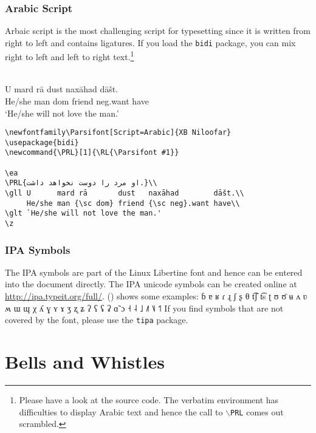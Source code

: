 \subsubsection{Arabic Script}

Arbaic script is the most challenging script for typesetting since it is written from right to left
and contains ligatures. If you load the \texttt{bidi} package, you can mix right to left and left to
right text.\footnote{
  Please have a look at the source code. The verbatim environment has difficulties to display Arabic
  text and hence the call to \texttt{$\backslash$PRL} comes out scrambled.
}

\ea
{}\\
 \gll   U mard rā dust naxāhad dāšt.\\
   He/she man {\sc dom} friend {\sc neg}.want have\\
\glt `He/she will not love the man.'
\z

\begin{verbatim}
\newfontfamily\Parsifont[Script=Arabic]{XB Niloofar}
\usepackage{bidi}
\newcommand{\PRL}[1]{\RL{\Parsifont #1}}

\ea
\PRL{او مرد را دوست نخواهد داشت.}\\
\gll U      mard rā       dust   naxāhad        dāšt.\\
     He/she man {\sc dom} friend {\sc neg}.want have\\
\glt `He/she will not love the man.'
\z
\end{verbatim}

\subsubsection{IPA Symbols}

The IPA symbols are part of the Linux Libertine font and hence can be entered into the document
directly. The IPA unicode symbols can be created online at
\url{http://ipa.typeit.org/full/}. () shows some examples:
\ea
ɓ ɐ ʁ ɾ ɻ ʃ ʂ θ t͡ʃ  t͡s  ʈ ʊ ʊ̈ ʉ ʌ ʋ ʍ ɯ ɰ χ ʎ ɣ ʏ ɤ ʒ ʐ ʑ ʔ ʕ ʢ ʡ ɑ̃ ɔ ˧ ˨ ˩ ˩˥ ˥˩ ˦˥
\z
If you find symbols that are not covered by the font, please use the \texttt{tipa} package.

\section{Bells and Whistles}

